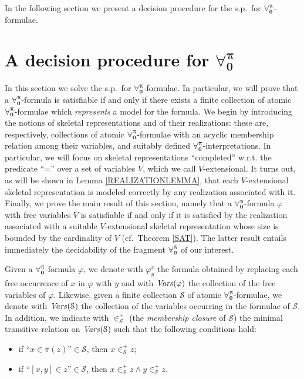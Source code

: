 \documentclass[a4paper,UKenglish]{lipics}
\newcommand{\Lang}{\ensuremath{\mathbf{\forall_{0}^{\pi}}}\xspace}
\newcommand{\nonpairs}[1]{\bar{\pi}(#1)}
\newcommand{\atset}{\mathcal{S}}
\newcommand{\memclosure}[1]{\in_{#1}^{+}}
\newcommand{\aslit}[1]{\mbox{``}#1\mbox{''}}
\begin{document}
In the following section we present a decision procedure for the
s.p.\ for \Lang-formulae.

\section{A decision procedure for \Lang}\label{DECPROC}
In this section we solve the s.p.\ for \Lang-formulae.  
In particular,
we will prove that a \Lang-formula is satisfiable if and only if
there exists a finite collection of atomic \Lang-formulae which
\emph{represents} a model for the formula.  
We begin by
introducing the notions of skeletal representations and of their
realizations: these are, respectively, collections of atomic
\Lang-formulae with an acyclic membership relation among their
variables, and suitably defined \Lang-interpretations.  In particular,
we will focus on skeletal representations ``completed'' w.r.t. the
predicate ``='' over a set of variables $V$, which we call
$V$-extensional.
It turns out, as will be shown in Lemma \ref{REALIZATIONLEMMA}, that
each $V$-extensional skeletal representation is modeled correctly by
any realization associated with it.  Finally, we prove the main result
of this section, namely that a \Lang-formula $\varphi$ with free
variables $V$ is satisfiable if and only if it is satisfied by the
realization associated with a suitable $V$-extensional skeletal
representation whose size is bounded by the cardinality of $V$ (cf.\
Theorem \ref{SAT}).  The latter result entails immediately the
decidability of the fragment \Lang of our interest.

Given a \Lang-formula $\varphi$, we denote with $\varphi^{x}_{y}$ the
formula obtained by replacing each free occurrence of $x$ in $\varphi$
with $y$ and with $\mathit{Vars}(\varphi)$ the collection of the free
variables of $\varphi$.  Likewise, given a finite collection $\atset$
of atomic \Lang-formulae, we denote with $\Vars(\atset)$ the
collection of the variables occurring in the formulae of $\atset$.  In
addition, we indicate with $\memclosure{\atset}$ (the \emph{membership
closure} of $\atset$) the minimal transitive relation on
$\Vars(\atset)$ such that the following conditions hold:
\begin{itemize}
    \item if $\aslit{x \in \nonpairs{z}} \in \atset$, then $x
    \memclosure{\atset} z$;

    \item if $\aslit{[x,y] \in z} \in \atset$, then $x
    \memclosure{\atset} z \wedge y \memclosure{\atset} z$.
\end{itemize}
\end{document}
